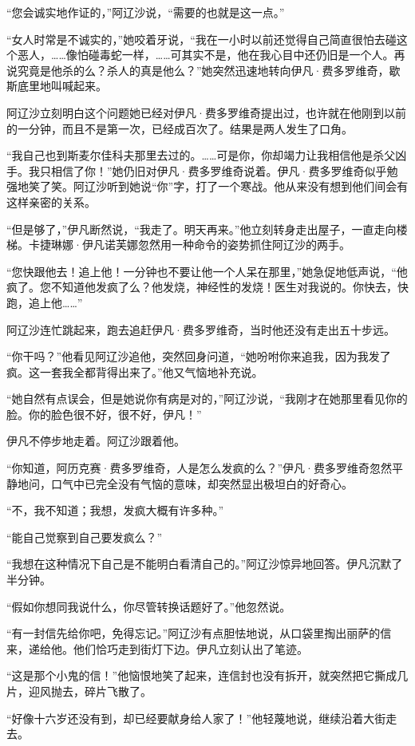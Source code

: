 \par “您会诚实地作证的，”阿辽沙说，“需要的也就是这一点。”
\par “女人时常是不诚实的，”她咬着牙说，“我在一小时以前还觉得自己简直很怕去碰这个恶人，……像怕碰毒蛇一样，……可其实不是，他在我心目中还仍旧是一个人。再说究竟是他杀的么？杀人的真是他么？”她突然迅速地转向伊凡·费多罗维奇，歇斯底里地叫喊起来。
\par 阿辽沙立刻明白这个问题她已经对伊凡·费多罗维奇提出过，也许就在他刚到以前的一分钟，而且不是第一次，已经成百次了。结果是两人发生了口角。
\par “我自己也到斯麦尔佳科夫那里去过的。……可是你，你却竭力让我相信他是杀父凶手。我只相信了你！”她仍旧对伊凡·费多罗维奇说着。伊凡·费多罗维奇似乎勉强地笑了笑。阿辽沙听到她说“你”字，打了一个寒战。他从来没有想到他们间会有这样亲密的关系。
\par “但是够了，”伊凡断然说，“我走了。明天再来。”他立刻转身走出屋子，一直走向楼梯。卡捷琳娜·伊凡诺芙娜忽然用一种命令的姿势抓住阿辽沙的两手。
\par “您快跟他去！追上他！一分钟也不要让他一个人呆在那里，”她急促地低声说，“他疯了。您不知道他发疯了么？他发烧，神经性的发烧！医生对我说的。你快去，快跑，追上他……”
\par 阿辽沙连忙跳起来，跑去追赶伊凡·费多罗维奇，当时他还没有走出五十步远。
\par “你干吗？”他看见阿辽沙追他，突然回身问道，“她吩咐你来追我，因为我发了疯。这一套我全都背得出来了。”他又气恼地补充说。
\par “她自然有点误会，但是她说你有病是对的，”阿辽沙说，“我刚才在她那里看见你的脸。你的脸色很不好，很不好，伊凡！”
\par 伊凡不停步地走着。阿辽沙跟着他。
\par “你知道，阿历克赛·费多罗维奇，人是怎么发疯的么？”伊凡·费多罗维奇忽然平静地问，口气中已完全没有气恼的意味，却突然显出极坦白的好奇心。
\par “不，我不知道；我想，发疯大概有许多种。”
\par “能自己觉察到自己要发疯么？”
\par “我想在这种情况下自己是不能明白看清自己的。”阿辽沙惊异地回答。伊凡沉默了半分钟。
\par “假如你想同我说什么，你尽管转换话题好了。”他忽然说。
\par “有一封信先给你吧，免得忘记。”阿辽沙有点胆怯地说，从口袋里掏出丽萨的信来，递给他。他们恰巧走到街灯下边。伊凡立刻认出了笔迹。
\par “这是那个小鬼的信！”他恼恨地笑了起来，连信封也没有拆开，就突然把它撕成几片，迎风抛去，碎片飞散了。
\par “好像十六岁还没有到，却已经要献身给人家了！”他轻蔑地说，继续沿着大街走去。
